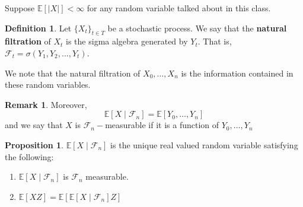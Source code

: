 \documentclass[10pt, oneside]{article}
\newcommand{\bbE}{\mathbb{E}}
\theoremstyle{definition}
\newtheorem{defn}{Definition}
\newtheorem{prop}{Proposition}
\newtheorem{rem}{Remark}
\begin{document}
Suppose $\bbE[|X|] < \infty$ for any random variable talked about in this class.
\begin{defn}
 Let $\{X_t\}_{t∈T}$ be a stochastic process. We say that the \textbf{natural filtration} of $X_t$ is the sigma algebra generated by $Y_t$. That is,
 $\mathcal{F}_t =\sigma(Y_1,Y_2,...,Y_t)$.
\end{defn}
We note that the natural filtration of $X_0, \dots, X_n$ is the information contained in these random variables. 
\begin{rem}
    Moreover, 
    \[\bbE[X \mid \mathcal{F}_n] = \bbE[Y_0, \dots, Y_n]\]
 and we say that $X$ is $\mathcal{F}_n-$measurable if it is a function of $Y_0, \dots, Y_n$
 \end{rem}
 \begin{prop}
     $\bbE[X \mid \mathcal{F}_n]$ is the unique real valued random variable satisfying the following:
     \begin{enumerate}
         \item $\bbE[X \mid \mathcal{F}_n]$ is $\mathcal{F}_n$ measurable.
         \item $\bbE[X  Z] = \bbE[\bbE[X \mid \mathcal{F}_n]  Z]$
     \end{enumerate}
 \end{prop}
\end{document}
